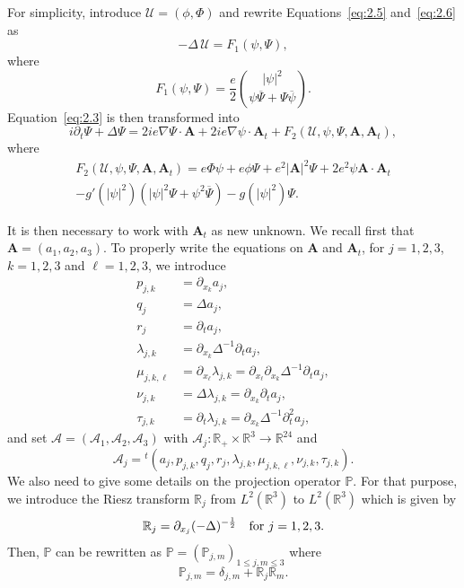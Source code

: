 \documentclass[AHL,Unicode,longabstracts]{cedram}
\newcommand{\BA}{\mathbf{A}}
\newcommand{\R}{\mathbb{R}}
\begin{document}
For simplicity, introduce $\mathcal{U}=(\phi,\Phi)$ and rewrite Equations~\eqref{eq:2.5} and~\eqref{eq:2.6} as
\begin{equation}\label{eq:2.8}
-\Delta \, \mathcal{U} = F_1(\psi,\Psi),
\end{equation}
where
\[
F_1(\psi,\Psi)=\frac{e}{2}
\binom{|\psi |^2}{\psi \overline{\Psi}+\Psi \overline{\psi}}.
\]
Equation~\eqref{eq:2.3} is then transformed into
\begin{equation}\label{eq:2.9}
i\partial_t \Psi +\Delta \Psi = 2i e \nabla \Psi \cdot \BA +2ie \nabla\psi \cdot \BA_t +F_2(\mathcal{U},\psi,\Psi,\BA,\BA_t),
\end{equation}
where
\begin{multline*}
F_2(\mathcal{U},\psi,\Psi,\BA,\BA_t) = e\Phi\psi +e\phi\Psi +e^2| \BA |^2\Psi +2e^2 \psi \BA\cdot \BA_t \\
-g'(|\psi|^2)(|\psi|^2\Psi+\psi^2\overline{\Psi})-g(|\psi|^2)\Psi.
\end{multline*}

It is then necessary to work with $\BA_t$ as new unknown. We recall first that $\BA=(a_1,a_2,a_3)$. To properly write the equations on $\BA$ and $\BA_t$, for $j=1,2,3$, $k=1,2,3$ and $\ell=1,2,3$, we introduce
\begin{align*}
p_{j,k}&= \partial_{x_k} a_j, \\
q_j&= \Delta a_j, \\
r_j&= \partial_t a_j, \\
\lambda_{j,k} &= \partial_{x_k} \Delta^{-1} \partial_t a_j, \\
\mu_{j,k,\ell} &= \partial_{x_\ell} \lambda_{j,k} = \partial_{x_\ell} \partial_{x_k} \Delta^{-1} \partial_t a_j, \\
\nu_{j,k}&= \Delta \lambda_{j,k}= \partial_{x_k} \partial_t a_j,\\
\tau_{j,k}&= \partial_t \lambda_{j,k}= \partial_{x_k} \Delta^{-1} \partial_t^2 a_j,
\end{align*}
and set $\mathcal{A}=(\mathcal{A}_1, \mathcal{A}_2, \mathcal{A}_3)$ with $\mathcal{A}_j: \R_+ \times \R^3 \to \R^{24}$ and
\[
\mathcal{A}_j={}^t
(a_j, p_{j,k}, q_j, r_j, \lambda_{j,k}, \mu_{j,k,\ell}, \nu_{j,k}, \tau_{j,k}).
\]
We also need to give some details on the projection operator ${\mathbb P}$. For that purpose, we introduce the Riesz transform ${\mathbb R}_j$ from $L^2(\R^3)$ to $L^2(\R^3)$ which is given by
\[
{\mathbb R}_j= \partial_{x_j} (-\Delta)^{-\frac{1}{2}} \quad \hbox{for} \ j=1,2,3.
\]
Then, ${\mathbb P}$ can be rewritten as ${\mathbb P}=({\mathbb P}_{j,m})_{1\leq j,m\leq 3}$ where
\[
{\mathbb P}_{j,m} =\delta_{j,m} +{\mathbb R}_j {\mathbb R}_m.
\]
\end{document}
